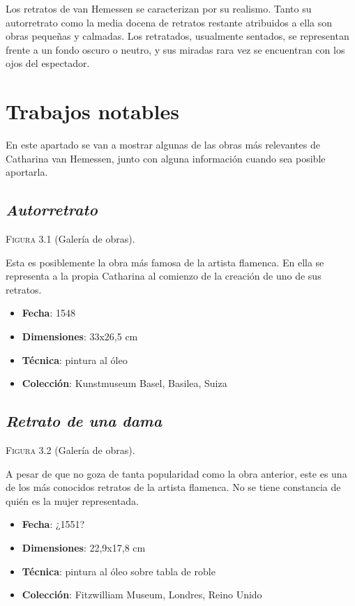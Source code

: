 \documentclass[12pt]{book}
\begin{document}
Los retratos de van Hemessen se caracterizan por su realismo. Tanto su autorretrato como la media docena de retratos restante atribuidos a ella son obras pequeñas y calmadas. Los retratados, usualmente sentados, se representan frente a un fondo oscuro o neutro, y sus miradas rara vez se encuentran con los ojos del espectador.\bigskip

\chapter{Trabajos notables}

En este apartado se van a mostrar algunas de las obras más relevantes de Catharina van Hemessen, junto con alguna información cuando sea posible aportarla.

\section{\textit{Autorretrato}}

\textsc{Figura 3.1} (Galería de obras).\bigskip

Esta es posiblemente la obra más famosa de la artista flamenca. En ella se representa a la propia Catharina al comienzo de la creación de uno de sus retratos.
\begin{itemize}
	\item \textbf{Fecha}: 1548
	\item \textbf{Dimensiones}: 33x26,5 cm
	\item \textbf{Técnica}: pintura al óleo
	\item \textbf{Colección}: Kunstmuseum Basel, Basilea, Suiza
\end{itemize}

\section{\textit{Retrato de una dama}}

\textsc{Figura 3.2} (Galería de obras).\bigskip

A pesar de que no goza de tanta popularidad como la obra anterior, este es una de los más conocidos retratos de la artista flamenca. No se tiene constancia de quién es la mujer representada.
\begin{itemize}
	\item \textbf{Fecha}: ¿1551?
	\item \textbf{Dimensiones}: 22,9x17,8 cm
	\item \textbf{Técnica}: pintura al óleo sobre tabla de roble
	\item \textbf{Colección}: Fitzwilliam Museum, Londres, Reino Unido
\end{itemize}
\end{document}
